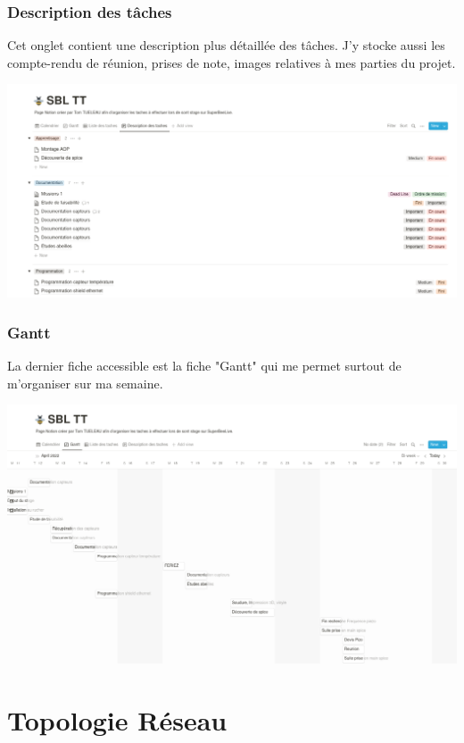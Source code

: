 \documentclass[11pt,french,a4paper]{article}
\begin{document}
\subsubsection{Description des tâches}
Cet onglet contient une description plus détaillée des tâches. J'y stocke aussi les compte-rendu de réunion, prises de note, images relatives à mes parties du projet.
\begin{center}	
\includegraphics[scale=0.35]{../img/notiondescriptiondestaches.png}
\label{Description des taches}
\end{center}

\subsubsection{Gantt}
La dernier fiche accessible est la fiche "Gantt" qui me permet surtout de m'organiser sur ma semaine. 
\begin{center}	
\includegraphics[scale=0.35]{../img/notiongantt.png}
\label{Gantt}
\end{center}
\newpage 

\newpage

\section{Topologie Réseau}
\end{document}
